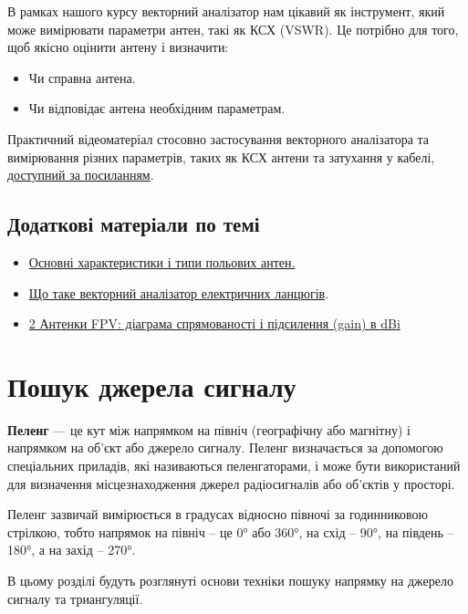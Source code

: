 \documentclass{article}
\begin{document}
В рамках нашого курсу векторний аналізатор нам цікавий як інструмент, який може вимірювати параметри антен, такі як КСХ (VSWR). Це потрібно для того, щоб якісно оцінити антену і визначити:

\begin{itemize}[noitemsep, topsep=8pt]
\item Чи справна антена.
\item Чи відповідає антена необхідним параметрам.
\end{itemize}

Практичний відеоматеріал стосовно застосування векторного аналізатора та вимірювання різних параметрів, таких як КСХ антени та затухання у кабелі, \href{https://www.youtube.com/watch?v=S4V4TL_5KQg}{доступний за посиланням}.

\subsection{Додаткові матеріали по темі}
\begin{itemize}[noitemsep, topsep=8pt]
\item \href{https://sprotyvg7.com.ua/wp-content/uploads/2023/05/Osnovni-harakterystyky-anten_ukr.pdf}{Основні характеристики і типи польових антен.}
\item \href{https://www.tehencom.com/Categories/Network_Analyzers/Basics/Network_Analyzers_Basics-u.htm}{Що таке векторний аналізатор електричних ланцюгів}.
\item \href{https://www.youtube.com/watch?v=1me_Tz3CFmk}{2 Антенки FPV: діаграма спрямованості і підсилення (gain) в dBi}
\end{itemize}

\section{Пошук джерела сигналу}
 
\textbf{Пеленг} --- це кут між напрямком на північ (географічну або магнітну) і напрямком на об'єкт або джерело сигналу. Пеленг визначається за допомогою спеціальних приладів, які називаються пеленгаторами, і може бути використаний для визначення місцезнаходження джерел радіосигналів або об'єктів у просторі.

Пеленг зазвичай вимірюється в градусах відносно півночі за годинниковою стрілкою, тобто напрямок на північ -- це 0° або 360°, на схід -- 90°, на південь -- 180°, а на захід -- 270°.

В цьому розділі будуть розглянуті основи техніки пошуку напрямку на джерело сигналу та триангуляції.
\end{document}
